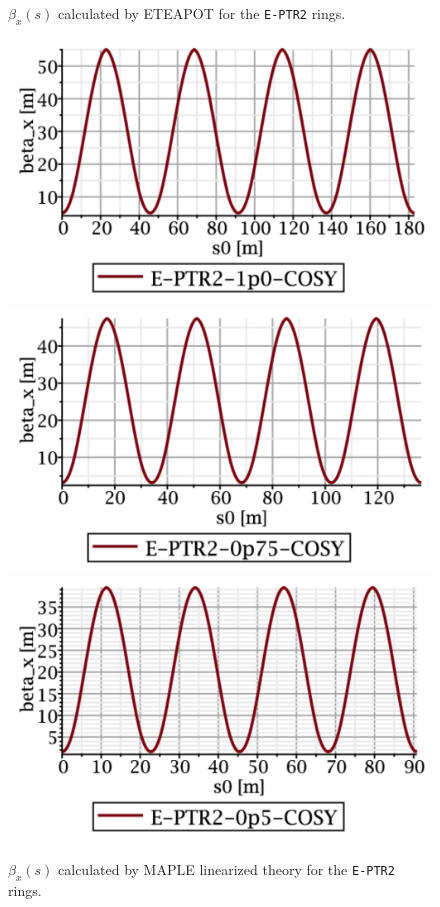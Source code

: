 \documentclass[]{article}
\begin{document}
\begin{figure}[htbp]
\begin{minipage}[b]{0.5\linewidth}
\caption{$\beta_x(s)$ calculated by ETEAPOT 
for the {\tt E-PTR2} rings.}
\label{fig:E-PTR2-ETEAPOT-betax}
\end{minipage}
%
%
\begin{minipage}[b]{0.49\linewidth}
\centering
\includegraphics[scale=0.40]{pdf/E-PTR2-1p0-COSY-MAPLE-betax.pdf}
\includegraphics[scale=0.40]{pdf/E-PTR2-0p75-COSY-MAPLE-betax.pdf}
\includegraphics[scale=0.40]{pdf/E-PTR2-0p5-COSY-MAPLE-betax.pdf}
\caption{$\beta_x(s)$ calculated by MAPLE linearized 
theory for the {\tt E-PTR2} rings.}
\label{fig:E-PTR2-MAPLE-betax}
\end{minipage}
\end{figure}
\end{document}
